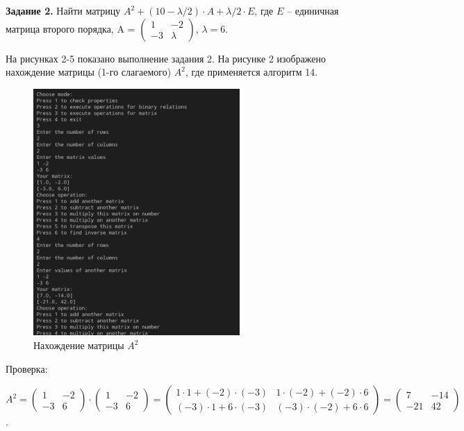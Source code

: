 \documentclass[bachelor, och, labwork]{shiza}
\begin{document}
        \textbf{Задание 2.} Найти матрицу $A^2 + (10 - \lambda / 2) \cdot A + \lambda / 2 \cdot E$, где $E$ -- единичная матрица
        второго порядка, A =
        $\begin{pmatrix}
            1 & -2 \\
            -3 & \lambda
        \end{pmatrix}$, $\lambda = 6$.

        На рисунках 2-5 показано выполнение задания 2.
        На рисунке 2 изображено нахождение матрицы (1-го слагаемого) $A^2$, где применяется алгоритм 14.
        
        \begin{figure}[H]
            \centering
            \includegraphics[width=0.7\textwidth]{photo/2.png}
            \caption{Нахождение матрицы $A^2$}
        \end{figure}

        Проверка:
        
        $A^2 = 
        \begin{pmatrix}
            1 & -2 \\
            -3 & 6
        \end{pmatrix} \cdot 
        \begin{pmatrix}
            1 & -2 \\
            -3 & 6
        \end{pmatrix} =
        \begin{pmatrix}
            1 \cdot 1 + (-2) \cdot (-3) & 1 \cdot (-2) + (-2) \cdot 6 \\
            (-3) \cdot 1 + 6 \cdot (-3) & (-3) \cdot (-2) + 6 \cdot 6
        \end{pmatrix} =
        \begin{pmatrix}
            7 & -14 \\
            -21 & 42
        \end{pmatrix}$.
\end{document}
